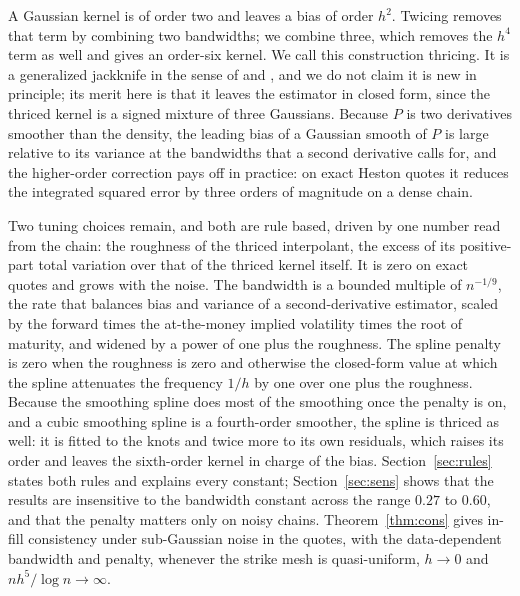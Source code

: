 \documentclass[preprint,12pt,authoryear,times]{elsarticle}
\begin{document}
A Gaussian kernel is of order two and leaves a bias of order \(h^2\). Twicing \citep{tukey1977,schucanysommers1977} removes that term by combining two bandwidths; we combine three, which removes the \(h^4\) term as well and gives an order-six kernel. We call this construction thricing. It is a generalized jackknife in the sense of \citet{schucanysommers1977} and \citet{jonesfoster1993}, and we do not claim it is new in principle; its merit here is that it leaves the estimator in closed form, since the thriced kernel is a signed mixture of three Gaussians. Because \(P\) is two derivatives smoother than the density, the leading bias of a Gaussian smooth of \(P\) is large relative to its variance at the bandwidths that a second derivative calls for, and the higher-order correction pays off in practice: on exact Heston quotes it reduces the integrated squared error by three orders of magnitude on a dense chain.

Two tuning choices remain, and both are rule based, driven by one number read from the chain: the roughness of the thriced interpolant, the excess of its positive-part total variation over that of the thriced kernel itself. It is zero on exact quotes and grows with the noise. The bandwidth is a bounded multiple of \(n^{-1/9}\), the rate that balances bias and variance of a second-derivative estimator, scaled by the forward times the at-the-money implied volatility times the root of maturity, and widened by a power of one plus the roughness. The spline penalty is zero when the roughness is zero and otherwise the closed-form value at which the spline attenuates the frequency \(1/h\) by one over one plus the roughness. Because the smoothing spline does most of the smoothing once the penalty is on, and a cubic smoothing spline is a fourth-order smoother, the spline is thriced as well: it is fitted to the knots and twice more to its own residuals, which raises its order and leaves the sixth-order kernel in charge of the bias. Section~\ref{sec:rules} states both rules and explains every constant; Section~\ref{sec:sens} shows that the results are insensitive to the bandwidth constant across the range \(0.27\) to \(0.60\), and that the penalty matters only on noisy chains. Theorem~\ref{thm:cons} gives in-fill consistency under sub-Gaussian noise in the quotes, with the data-dependent bandwidth and penalty, whenever the strike mesh is quasi-uniform, \(h\to 0\) and \(nh^5/\log n\to\infty\).
\end{document}
